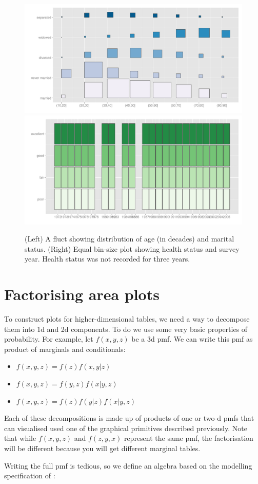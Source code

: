 \documentclass[letterpaper,oneside]{scrartcl}
\begin{document}
\begin{figure}[htbp]
  \centering
    \includegraphics[width=0.5\linewidth]{part-fluct}%
    \includegraphics[width=0.5\linewidth]{part-fluct-cond}
  \caption{(Left) A fluct showing distribution of age (in decades) and marital status. (Right) Equal bin-size plot showing health status and survey year. Health status was not recorded for three years.}
  \label{fig:fluct}
\end{figure}

\section{Factorising area plots}
\label{sec:combination}

To construct plots for higher-dimensional tables, we need a way to decompose them into 1d and 2d components. To do we use some very basic properties of probability.  For example, let $f(x, y, z)$ be a 3d pmf. We can write this pmf as product of marginals and conditionals:

\begin{itemize}
  \item $f(x, y, z) = f(z) f(x, y | z)$
  \item $f(x, y, z) = f(y, z) f(x | y, z) $
  \item $f(x, y, z) = f(z) f(y | z) f(x | y, z)$
\end{itemize}

\noindent Each of these decompositions is made up of products of one or two-d pmfs that can visualised used one of the graphical primitives described previously. Note that while $f(x, y, z)$ and $f(z, y, x)$ represent the same pmf, the factorisation will be different because you will get different marginal tables.

Writing the full pmf is tedious, so we define an algebra based on the modelling specification of \citet{wilkinson:1973}:
\end{document}
